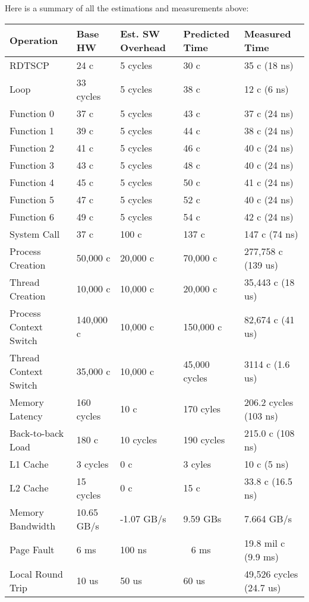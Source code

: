 \documentclass[paper=a4, fontsize=11pt]{scrartcl}
\numberwithin{equation}{section}        %
\numberwithin{figure}{section}          %
\numberwithin{table}{section}               %
\begin{document}
Here is a summary of all the estimations and measurements above:

\begin{center}
    \begin{tabular}{ | l | l | l | l | l |}
    \hline
    Operation & Base HW & Est. SW Overhead & Predicted Time & Measured Time \\ \hline
    RDTSCP & 24 c & 5 cycles & 30 c & 35 c (18 ns) \\ 
    Loop & 33 cycles & 5 cycles & 38 c & 12 c (6 ns) \\ 
    Function 0 & 37 c & 5 cycles & 43 c & 37 c (24 ns) \\
    Function 1 & 39 c & 5 cycles & 44 c & 38 c (24 ns) \\ 
    Function 2 & 41 c & 5 cycles & 46 c & 40 c (24 ns) \\ 
    Function 3 & 43 c & 5 cycles & 48 c & 40 c (24 ns) \\ 
    Function 4 & 45 c & 5 cycles & 50 c & 41 c (24 ns) \\
    Function 5 & 47 c & 5 cycles & 52 c & 40 c (24 ns) \\ 
    Function 6 & 49 c & 5 cycles & 54 c & 42 c (24 ns) \\ 
    System Call & 37 c & 100 c & 137 c & 147 c (74 ns) \\ 
    Process Creation & 50,000 c & 20,000 c & 70,000 c & 277,758 c (139 us) \\ 
    Thread Creation & 10,000 c & 10,000 c & 20,000 c & 35,443 c (18 us) \\
    Process Context Switch & 140,000 c & 10,000 c & 150,000 c & 82,674 c (41 us) \\ 
    Thread Context Switch & 35,000 c & 10,000 c & 45,000 cycles & 3114 c (1.6 us) \\
    Memory Latency & 160 cycles & 10 c & 170 cyles & 206.2 cycles (103 ns) \\ 
    Back-to-back Load & 180 c & 10 cycles & 190 cycles & 215.0 c (108 ns) \\
    L1 Cache & 3 cycles & 0 c & 3 cyles & 10 c (5 ns) \\ 
    L2 Cache & 15 cycles & 0 c & 15 c & 33.8 c (16.5 ns) \\
    Memory Bandwidth &  10.65 GB/s  & -1.07 GB/s & 9.59 GBs & 7.664 GB/s \\
    Page Fault & 6 ms & 100 ns & ~ 6 ms & 19.8 mil c (9.9 ms) \\ 
    Local Round Trip & 10 us & 50 us & 60 us & 49,526 cycles (24.7 us) \\ 

\end{tabular}
\end{center}
\end{document}
